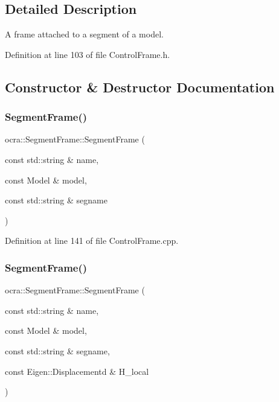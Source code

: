 \subsection{Detailed Description}
A frame attached to a segment of a model. 

Definition at line 103 of file Control\+Frame.\+h.



\subsection{Constructor \& Destructor Documentation}
\hypertarget{classocra_1_1SegmentFrame_ab05987e2ecc0f904c905b9e66269ce84}{}\label{classocra_1_1SegmentFrame_ab05987e2ecc0f904c905b9e66269ce84} 
\subsubsection{\texorpdfstring{Segment\+Frame()}{SegmentFrame()}\hspace{0.1cm}{\footnotesize\ttfamily [1/4]}}
{\footnotesize\ttfamily ocra\+::\+Segment\+Frame\+::\+Segment\+Frame (\begin{DoxyParamCaption}\item[{const std\+::string \&}]{name,  }\item[{const Model \&}]{model,  }\item[{const std\+::string \&}]{segname }\end{DoxyParamCaption})}



Definition at line 141 of file Control\+Frame.\+cpp.

\hypertarget{classocra_1_1SegmentFrame_ad9cd47c330239c77e913d38029af808d}{}\label{classocra_1_1SegmentFrame_ad9cd47c330239c77e913d38029af808d} 
\subsubsection{\texorpdfstring{Segment\+Frame()}{SegmentFrame()}\hspace{0.1cm}{\footnotesize\ttfamily [2/4]}}
{\footnotesize\ttfamily ocra\+::\+Segment\+Frame\+::\+Segment\+Frame (\begin{DoxyParamCaption}\item[{const std\+::string \&}]{name,  }\item[{const Model \&}]{model,  }\item[{const std\+::string \&}]{segname,  }\item[{const Eigen\+::\+Displacementd \&}]{H\+\_\+local }\end{DoxyParamCaption})}



